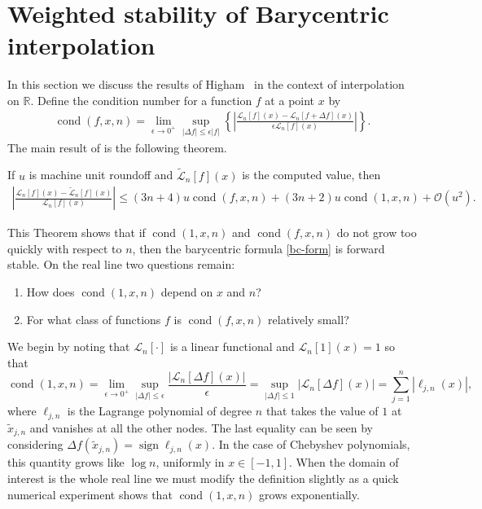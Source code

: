 \documentclass[final]{siamltex}
\begin{document}
\appendix

\section{Weighted stability of Barycentric interpolation}\label{stability}

In this section we discuss the results of Higham~\cite{Higham} in the context of interpolation on $\mathbb R$.  Define the condition number for a function $f$ at a point $x$ by
\begin{align*}
\operatorname{cond}(f,x,n) = \lim_{\epsilon \rightarrow 0^+} \sup_{|\Delta f| \leq \epsilon |f|} \left\{ \left| \frac{\mathcal L_n[f](x) - \mathcal L_n[f+ \Delta f](x)}{\epsilon \mathcal L_n[f](x) } \right| \right\}.
\end{align*}
The main result of \cite{Higham} is the following theorem.

\begin{theorem}
If $u$ is machine unit roundoff and $\tilde {\mathcal L}_n[f](x)$ is the computed value, then
\begin{align*}
\left| \frac{\mathcal L_n[f](x) - \tilde{\mathcal L}_n[f](x)}{\mathcal L_n[f](x)} \right|  \leq (3n+4) u \operatorname{cond}(f,x,n) + (3n + 2) u \operatorname{cond}(1,x,n) + {\mathcal O}(u^2).
\end{align*}
\end{theorem}

This Theorem shows that if $\operatorname{cond}(1,x,n)$ and $\operatorname{cond}(f,x,n)$ do not grow too quickly with respect to $n$, then the barycentric formula \eqref{bc-form} is forward stable.  On the real line two questions remain:
\begin{enumerate}
\item How does $\operatorname{cond}(1,x,n)$ depend on $x$ and $n$?
\item For what class of functions $f$ is $\operatorname{cond}(f,x,n)$ relatively small?
\end{enumerate}
We begin by noting that $\mathcal L_n[\cdot]$ is a linear functional and $\mathcal L_n[1](x) = 1$ so that
\[
\operatorname{cond}(1,x,n) = \lim_{\epsilon \rightarrow 0^+} \sup_{|\Delta f| \leq \epsilon} \frac{|\mathcal L_n[\Delta f](x) |}{\epsilon} = \sup_{|\Delta f| \leq 1} |\mathcal L_n[\Delta f](x) | = \sum_{j=1}^n |\ell_{j,n}(x)|,
\]
where $\ell_{j,n}$ is the Lagrange polynomial of degree $n$ that takes the value of $1$ at $\tilde x_{j,n}$ and vanishes at all the other nodes.  The last equality can be seen by considering $\Delta f(\tilde x_{j,n}) = \operatorname{sign} \ell_{j,n}(x)$.  In the case of Chebyshev polynomials, this quantity grows like $\log n$, uniformly in $x \in [-1,1]$.  When the domain of interest is the whole real line we must 
modify the definition slightly as a quick numerical experiment shows that $\operatorname{cond}(1,x,n)$ grows exponentially.
\end{document}
